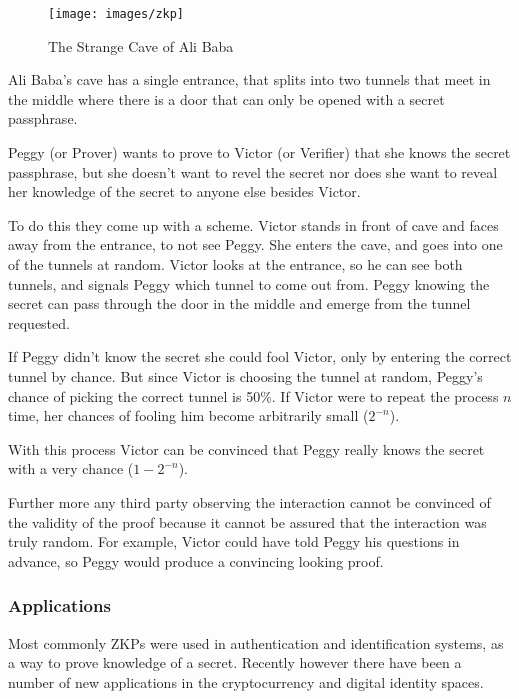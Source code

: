 \begin{figure}[h]
	\centering
	\texttt{[image: images/zkp]}
	\caption{The Strange Cave of Ali Baba}
	\label{fig:strange-cave-of-alibaba}
\end{figure}

\bigskip

Ali Baba's cave has a single entrance, that splits into two tunnels that meet in the middle where there is a door that can only be opened with a secret passphrase.

\bigskip

Peggy (or Prover) wants to prove to Victor (or Verifier) that she knows the secret passphrase, but she doesn't want to revel the secret nor does she want to reveal her knowledge of the secret to anyone else besides Victor.

\bigskip

To do this they come up with a scheme.
Victor stands in front of cave and faces away from the entrance, to not see Peggy. She enters the cave, and goes into one of the tunnels at random.
Victor looks at the entrance, so he can see both tunnels, and signals Peggy which tunnel to come out from.
Peggy knowing the secret can pass through the door in the middle and emerge from the tunnel requested.

\bigskip

If Peggy didn't know the secret she could fool Victor, only by entering the correct tunnel by chance.
But since Victor is choosing the tunnel at random, Peggy's chance of picking the correct tunnel is 50\%. If Victor were to repeat the process $n$ time, her chances of fooling him become arbitrarily small ($2^{-n}$).

With this process Victor can be convinced that Peggy really knows the secret with a very chance ($1 - 2^{-n}$).

\bigskip

Further more any third party observing the interaction cannot be convinced of the validity of the proof because it cannot be assured that the interaction was truly random. 
For example, Victor could have told Peggy his questions in advance, so Peggy would produce a convincing looking proof.

\subsubsection{Applications}
Most commonly ZKPs were used in authentication and identification systems, as a way to prove knowledge of a secret. 
Recently however there have been a number of new applications in the cryptocurrency and digital identity spaces.

